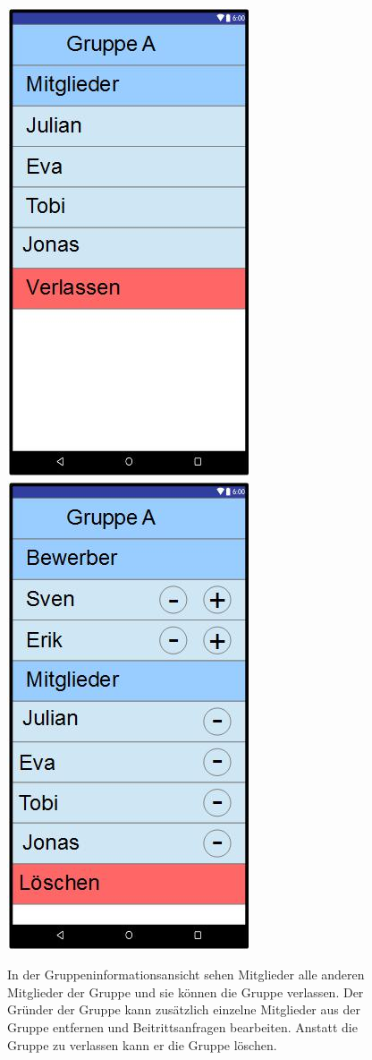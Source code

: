 \documentclass{scrartcl}
\begin{document}
	\newpage
	\begin{figure}[h]
		\includegraphics[width=.5\textwidth]{GUI_GruppeInfoNormal.jpg}
		\includegraphics[width=.5\textwidth]{GUI_GruppeInfoGruender.jpg}
		\caption{In der Gruppeninformationsansicht sehen Mitglieder alle anderen Mitglieder der Gruppe und sie können die Gruppe verlassen. Der Gründer der Gruppe kann zusätzlich einzelne Mitglieder aus der Gruppe entfernen und Beitrittsanfragen bearbeiten. Anstatt die Gruppe zu verlassen kann er die Gruppe löschen.}
	\end{figure}
	
\end{document}
